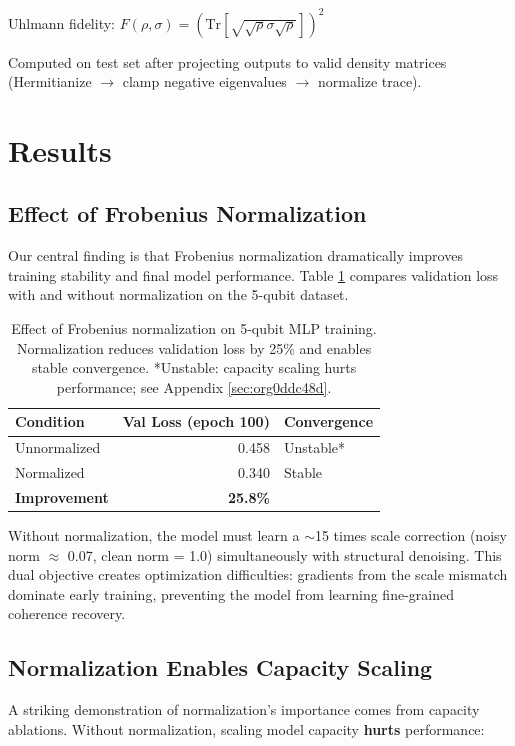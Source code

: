 \documentclass[11pt]{article}
\begin{document}
Uhlmann fidelity: \(F(\rho, \sigma) = (\mathrm{Tr}[\sqrt{\sqrt{\rho}\sigma\sqrt{\rho}}])^2\)

Computed on test set after projecting outputs to valid density matrices (Hermitianize \(\to\) clamp negative eigenvalues \(\to\) normalize trace).
\section{Results}
\label{sec:orgcab33f9}

\subsection{Effect of Frobenius Normalization}
\label{sec:org52af514}

Our central finding is that Frobenius normalization dramatically improves training stability and final model performance. Table \ref{tab:org30ecd9e} compares validation loss with and without normalization on the 5-qubit dataset.

\begin{table}[htbp]
\caption{\label{tab:org30ecd9e}Effect of Frobenius normalization on 5-qubit MLP training. Normalization reduces validation loss by 25\% and enables stable convergence. *Unstable: capacity scaling hurts performance; see Appendix \ref{sec:org0ddc48d}.}
\centering
\begin{tabular}{lrl}
Condition & Val Loss (epoch 100) & Convergence\\
\hline
Unnormalized & 0.458 & Unstable*\\
Normalized & 0.340 & Stable\\
\textbf{Improvement} & \textbf{25.8\%} & \\
\end{tabular}
\end{table}

Without normalization, the model must learn a \(\sim\)15 times scale correction (noisy norm \(\approx\) 0.07, clean norm = 1.0) simultaneously with structural denoising. This dual objective creates optimization difficulties: gradients from the scale mismatch dominate early training, preventing the model from learning fine-grained coherence recovery.
\subsection{Normalization Enables Capacity Scaling}
\label{sec:org036f89b}

A striking demonstration of normalization's importance comes from capacity ablations. Without normalization, scaling model capacity \textbf{hurts} performance:
\end{document}
